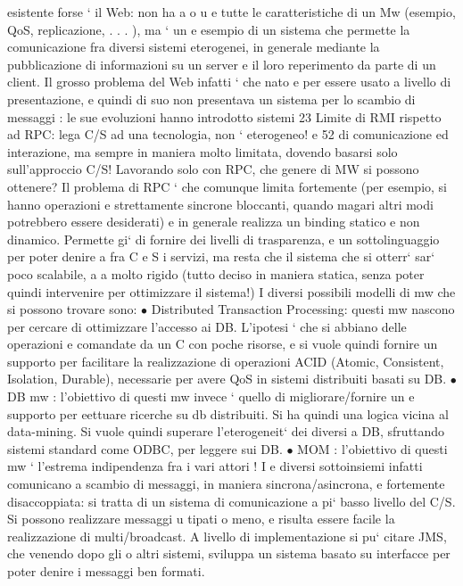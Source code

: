 \documentclass[a4paper,12pt]{article}
\begin{document}
esistente forse ` il Web: non ha
a
o
u
e
tutte le caratteristiche di un Mw (esempio, QoS, replicazione, . . . ), ma ` un
e
esempio di un sistema che permette la comunicazione fra diversi sistemi eterogenei, in generale mediante la
pubblicazione di informazioni su un server e il loro
reperimento da parte di un client. Il grosso problema del Web infatti ` che nato
e
per essere usato a livello di presentazione, e quindi di suo non presentava un
sistema per lo scambio di messaggi : le sue evoluzioni hanno introdotto sistemi
23 Limite
di RMI rispetto ad RPC: lega C/S ad una tecnologia, non ` eterogeneo!
e
52
di comunicazione ed interazione, ma sempre in maniera molto limitata, dovendo
basarsi solo sull'approccio C/S!
Lavorando solo con RPC, che genere di MW si possono ottenere? Il problema
di RPC ` che comunque limita fortemente (per esempio, si hanno operazioni
e
strettamente sincrone bloccanti, quando magari altri modi potrebbero essere
desiderati) e in generale realizza un binding statico e non dinamico. Permette
gi` di fornire dei livelli di trasparenza, e un sottolinguaggio per poter denire
a
fra C e S i servizi, ma resta che il sistema che si otterr` sar` poco scalabile,
a
a
molto rigido (tutto deciso in maniera statica, senza poter quindi intervenire per
ottimizzare il sistema!)
I diversi possibili modelli di mw che si possono trovare sono:
$\bullet$ Distributed Transaction Processing: questi mw nascono per cercare di
ottimizzare l'accesso ai DB. L'ipotesi ` che si abbiano delle operazioni
e
comandate da un C con poche risorse, e si vuole quindi fornire un supporto
per facilitare la realizzazione di operazioni ACID (Atomic, Consistent,
Isolation, Durable), necessarie per avere QoS in sistemi distribuiti basati
su DB.
$\bullet$ DB mw : l'obiettivo di questi mw invece ` quello di migliorare/fornire un
e
supporto per eettuare ricerche su db distribuiti. Si ha quindi una logica
vicina al data-mining. Si vuole quindi superare l'eterogeneit` dei diversi
a
DB, sfruttando sistemi standard come ODBC, per leggere sui DB.
$\bullet$ MOM : l'obiettivo di questi mw ` l'estrema indipendenza fra i vari attori ! I
e
diversi sottoinsiemi infatti comunicano a scambio di messaggi, in maniera
sincrona/asincrona, e fortemente disaccoppiata: si tratta di un sistema di
comunicazione a pi` basso livello del C/S. Si possono realizzare messaggi
u
tipati o meno, e risulta essere facile la realizzazione di multi/broadcast.
A livello di implementazione si pu` citare JMS, che venendo dopo gli
o
altri sistemi, sviluppa un sistema basato su interfacce per poter denire i
messaggi ben formati.
\end{document}
